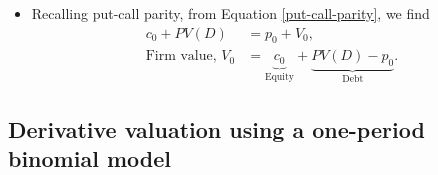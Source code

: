 \documentclass[../notes_compiled.tex]{subfiles}
\begin{document}
\begin{itemize}
\begin{equation}
\text{Risk debt} = \underbrace{\text{Risk-free debt}}_{\frac{X}{(1+R_{f})^{T}}} - \text{Put option}.
\end{equation}
An investor goes short a put option in order to receive the option premium. This is equivalent to the credit risk premium.
\item Recalling put-call parity, from Equation \ref{put-call-parity}, we find
\begin{align}
c_{0} + PV(D) &= p_{0} + V_{0}, \\
\text{Firm value, }V_{0} &=\underbrace{c_{0}}_{\text{Equity}} + \underbrace{PV(D)-p_{0}}_{\text{Debt}}.
\end{align}
\end{itemize}

\subsection{Derivative valuation using a one-period binomial model}
\end{document}
